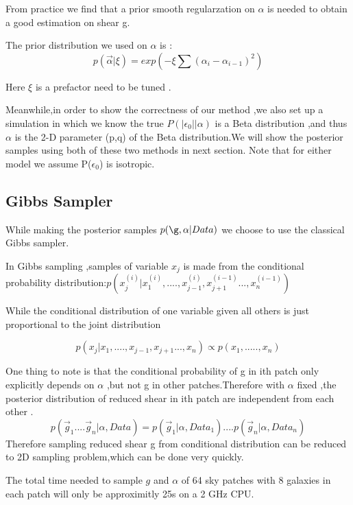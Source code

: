 \documentclass[useAMS,usenatbib]{mn2e}
\begin{document}
From practice we find that a prior smooth regularzation on $\alpha$
is needed to obtain a good estimation on shear g.

The prior distribution we used on $\alpha$ is : 
\begin{equation}
p(\vec{\alpha}|\xi)=exp(-\xi\sum(\alpha_{i}-\alpha_{i-1})^{2})
\end{equation}


Here $\xi$ is a prefactor need to be tuned .

Meanwhile,in order to show the correctness of our method ,we also
set up a simulation in which we know the true $P(|\epsilon_{0}||\alpha)$
is a Beta distribution ,and thus $\alpha$ is the 2-D parameter (p,q)
of the Beta distribution.We will show the posterior samples using
both of these two methods in next section. Note that for either model
we assume P($\epsilon_{0}$) is isotropic.


\subsection{Gibbs Sampler}

While making the posterior samples $p(\g,\alpha|Data)$ we choose to use the classical
Gibbs sampler.

In Gibbs sampling ,samples of variable $x_{j}$ is made from the conditional
probability distribution:$p(x_{j}^{(i)}|x_{1}^{(i)},....,x_{j-1}^{(i)},x_{j+1}^{(i-1)}...,x_{n}^{(i-1)})$

While the conditional distribution of one variable given all others
is just proportional to the joint distribution

\begin{equation}
p(x_{j}|x_{1},....,x_{j-1},x_{j+1}...,x_{n})\varpropto p(x_{1},.....,x_{n})
\end{equation}


One thing to note is that the conditional probability of g in ith
patch only explicitly depends on $\alpha$ ,but not g in other patches.Therefore
with $\alpha$ fixed ,the posterior distribution of reduced shear
in ith patch are independent from each other .
\begin{equation}
p(\vec{g}_{1}....\vec{g}_{n}|\alpha,Data)=p(\vec{g}_{1}|\alpha,Data_{1})....p(\vec{g}_{n}|\alpha,Data_{n})
\end{equation}
Therefore sampling reduced shear g from conditional distribution can
be reduced to 2D sampling problem,which can be done very quickly.

The total time needed to sample $g$ and $\alpha$ of 64 sky patches
with 8 galaxies in each patch will only be approximitly 25s on a 2
GHz CPU.
\end{document}
